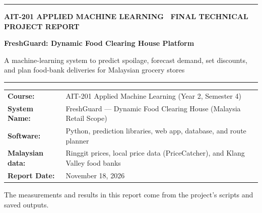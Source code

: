 \documentclass[12pt,a4paper]{article}
\renewcommand{\_}{\oldunderscore\allowbreak}
\begin{document}
\begin{titlepage}
    \thispagestyle{empty}
    \vspace*{1mm}
    {\color{RoyalAccent}\rule{\textwidth}{2.2pt}}
    \vspace{4mm}

    {\small\bfseries\color{TealAccent}\uppercase{AIT-201 Applied Machine Learning \textbullet\ Final Technical Project Report}}

    \vspace{3mm}
    {\raggedright\Huge\bfseries\color{NavyPrimary}FreshGuard: Dynamic Food Clearing House Platform\par}
    \vspace{2.5mm}
    {\large\color{SlateDark}A machine-learning system to predict spoilage, forecast demand, set discounts, and plan food-bank deliveries for Malaysian grocery stores\par}

    \vspace{4mm}
    {\color{BorderGray}\rule{\textwidth}{0.8pt}}
    \vspace{4mm}

    \begin{tcolorbox}[
        colback=LightBg,
        colframe=BorderGray,
        boxrule=0.7pt,
        arc=3pt,
        top=7pt, bottom=7pt, left=10pt, right=10pt
    ]
        \renewcommand{\arraystretch}{1.15}
        {\small
        \begin{tabularx}{\textwidth}{@{} >{\bfseries\color{NavyPrimary}}l >{\raggedright\arraybackslash}X @{}}
            Course:          & AIT-201 Applied Machine Learning (Year 2, Semester 4) \\
            System Name:     & FreshGuard --- Dynamic Food Clearing House (Malaysia Retail Scope) \\
            Software:        & Python, prediction libraries, web app, database, and route planner \\
            Malaysian data:  & Ringgit prices, local price data (PriceCatcher), and Klang Valley food banks \\
            Report Date:     & November 18, 2026 \\
        \end{tabularx}}
    \end{tcolorbox}



    \vfill
    \begin{center}
        {\scriptsize\color{SlateMuted}The measurements and results in this report come from the project's scripts and saved outputs.}
    \end{center}
\end{titlepage}
\end{document}
